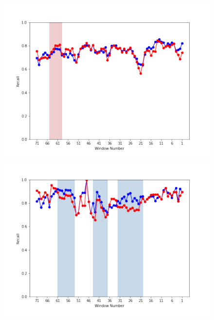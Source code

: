 \documentclass[submit]{ipsj}
\begin{document}
\begin{figure}[t]
\centering
\begin{minipage}[b]{0.65\columnwidth}
    \centering
    \includegraphics[width=1\columnwidth]{Uenaka_fig/RQ2_result/Nova/Nova_review_Recall.pdf}
    \includegraphics[width=1\columnwidth]{Uenaka_fig/RQ2_result/Neutron/Neutron_review_Recall.pdf}
\end{minipage}
\begin{minipage}[b]{0.65\columnwidth}
    \centering

\end{minipage}
\end{figure}
\end{document}
